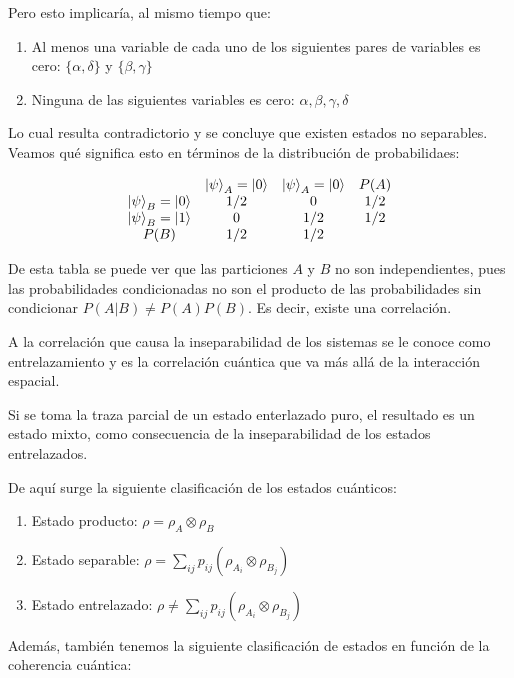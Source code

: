 Pero esto implicaría, al mismo tiempo que:

\begin{enumerate}
    \item Al menos una variable de cada uno de los siguientes pares de variables es cero: $\{\alpha, \delta\}$ y $\{\beta, \gamma\}$
    \item Ninguna de las siguientes variables es cero: $\alpha, \beta, \gamma, \delta$
\end{enumerate}

Lo cual resulta contradictorio y se concluye que existen estados no separables. Veamos qué significa esto en términos de la distribución de probabilidaes:

\[
\begin{array}{c c c c}
    & \ket{\psi}_A = \ket{0} & \ket{\psi}_A = \ket{0} & P(A) \\
    \ket{\psi}_B = \ket{0} & 1/2 & 0 & 1/2 \\
    \ket{\psi}_B = \ket{1} & 0 & 1/2 & 1/2 \\
    P(B) & 1/2 & 1/2 &
\end{array}
\]

De esta tabla se puede ver que las particiones $A$ y $B$ no son independientes, pues las probabilidades condicionadas no son el producto de las probabilidades sin condicionar $P(A|B) \neq P(A)P(B)$. Es decir, existe una correlación.

A la correlación que causa la inseparabilidad de los sistemas se le conoce como entrelazamiento y es la correlación cuántica que va más allá de la interacción espacial.

Si se toma la traza parcial de un estado enterlazado puro, el resultado es un estado mixto, como consecuencia de la inseparabilidad de los estados entrelazados.

De aquí surge la siguiente clasificación de los estados cuánticos:

\begin{enumerate}
    \item Estado producto: $\rho = \rho_A \otimes \rho_B$
    \item Estado separable: $\rho = \sum\limits_{i j} p_{i j} (\rho_{A_i} \otimes \rho_{B_j})$
    \item Estado entrelazado: $\rho \neq \sum\limits_{i j} p_{i j} (\rho_{A_i} \otimes \rho_{B_j})$
\end{enumerate}

Además, también tenemos la siguiente clasificación de estados en función de la coherencia cuántica:

